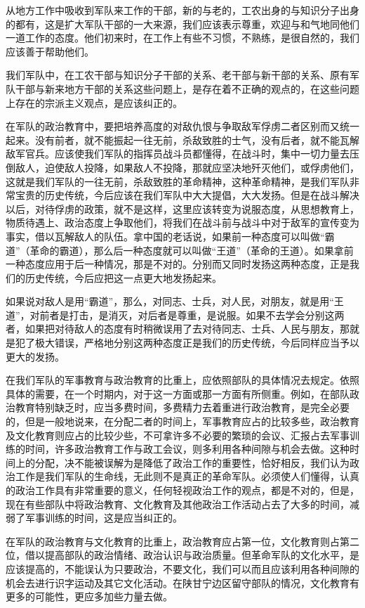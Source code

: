从地方工作中吸收到军队来工作的干部，新的与老的，工农出身的与知识分子出身的都有，这是扩大军队干部的一大来源，我们应该表示尊重，欢迎与和气地同他们一道工作的态度。他们初来时，在工作上有些不习惯，不熟练，是很自然的，我们应该善于帮助他们。

我们军队中，在工农干部与知识分子干部的关系、老干部与新干部的关系、原有军队干部与新来地方干部的关系这些问题上，是存在着不正确的观点的，在这些问题上存在的宗派主义观点，是应该纠正的。

在军队的政治教育中，要把培养高度的对敌仇恨与争取敌军俘虏二者区别而又统一起来。没有前者，就不能振起一往无前，杀敌致胜的士气，没有后者，就不能瓦解敌军官兵。应该使我们军队的指挥员战斗员都懂得，在战斗时，集中一切力量去压倒敌人，迫使敌人投降，如果敌人不投降，那就应坚决地歼灭他们，或俘虏他们，这就是我们军队的一往无前，杀敌致胜的革命精神，这种革命精神，是我们军队非常宝贵的历史传统，今后应该在我们军队中大大提倡，大大发扬。但是在战斗解决以后，对待俘虏的政策，就不是这样，这里应该转变为说服态度，从思想教育上，物质待遇上、政治态度上争取他们，将我们在战斗前与战斗中对于敌军的宣传变为事实，借以瓦解敌人的队伍。拿中国的老话说，如果前一种态度可以叫做“霸道”（革命的霸道），那么后一种态度就可以叫做“王道”（革命的王道）。如果拿前一种态度应用于后一种情况，那是不对的。分别而又同时发扬这两种态度，正是我们的历史传统，今后应把这一点更大地发扬起来。

如果说对敌人是用“霸道”，那么，对同志、士兵，对人民，对朋友，就是用“王道”，对前者是打击，是消灭，对后者是尊重，是说服。如果不去学会分别这两者，如果把对待敌人的态度有时稍微误用了去对待同志、士兵、人民与朋友，那就是犯了极大错误，严格地分别这两种态度正是我们的历史传统，今后同样应当予以更大的发扬。

在我们军队的军事教育与政治教育的比重上，应依照部队的具体情况去规定。依照具体的需要，在一个时期内，对于这一方面或那一方面有所侧重。例如，在部队政治教育特别缺乏时，应当多费时间，多费精力去着重进行政治教育，是完全必要的，但是一般地说来，在分配二者的时间上，军事教育应占的比较多些，政治教育及文化教育则应占的比较少些，不可拿许多不必要的繁琐的会议、汇报占去军事训练的时间，许多政治教育工作与政工会议，则多利用各种间隙与机会去做。这种时间上的分配，决不能被误解为是降低了政治工作的重要性，恰好相反，我们认为政治工作是我们军队的生命线，无此则不是真正的革命军队。必须使人们懂得，认真的政治工作具有非常重要的意义，任何轻视政治工作的观点，都是不对的，但是，现在有些部队中将政治教育、文化教育及其他政治工作活动占去了大多的时间，减弱了军事训练的时间，这是应当纠正的。

在军队的政治教育与文化教育的比重上，政治教育应占第一位，文化教育则占第二位，借以提高部队的政治情绪、政治认识与政治质量。但革命军队的文化水平，是应该提高的，不能误认为只要政治，不要文化，我们可以而且应该利用各种间隙的机会去进行识字运动及其它文化活动。在陕甘宁边区留守部队的情况，文化教育有更多的可能性，更应多加些力量去做。

